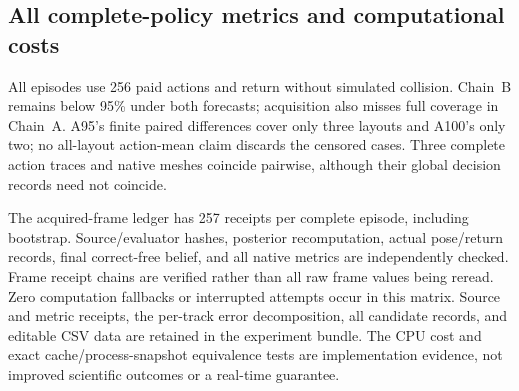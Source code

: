 \subsection{All complete-policy metrics and computational costs}
All episodes use 256 paid actions and return without simulated collision. Chain~B remains below 95\% under both forecasts; acquisition also misses full coverage in Chain~A. A95's finite paired differences cover only three layouts and A100's only two; no all-layout action-mean claim discards the censored cases. Three complete action traces and native meshes coincide pairwise, although their global decision records need not coincide.




The acquired-frame ledger has 257 receipts per complete episode, including bootstrap. Source/evaluator hashes, posterior recomputation, actual pose/return records, final correct-free belief, and all native metrics are independently checked. Frame receipt chains are verified rather than all raw frame values being reread. Zero computation fallbacks or interrupted attempts occur in this matrix. Source and metric receipts, the per-track error decomposition, all candidate records, and editable CSV data are retained in the experiment bundle. The CPU cost and exact cache/process-snapshot equivalence tests are implementation evidence, not improved scientific outcomes or a real-time guarantee.
